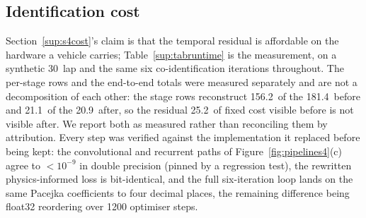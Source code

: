 \documentclass[12pt]{sn-jnl}
\makeatletter
\newif\ifsiu@prev
\DeclareRobustCommand{\siu@sep}{\ifsiu@prev\,\fi}
\DeclareRobustCommand{\siu@unit}[1]{\siu@sep\text{#1}\siu@prevtrue}
\DeclareRobustCommand{\siu@pre}[1]{\siu@sep\text{#1}\siu@prevfalse}
\DeclareRobustCommand{\siu@div}[1]{\text{#1}\siu@prevfalse}
\DeclareRobustCommand{\meter}{m}
\DeclareRobustCommand{\second}{s}
\DeclareRobustCommand{\gram}{g}
\DeclareRobustCommand{\newton}{N}
\DeclareRobustCommand{\radian}{rad}
\DeclareRobustCommand{\hertz}{Hz}
\DeclareRobustCommand{\percent}{\%}
\DeclareRobustCommand{\g}{\textit{g}}
\DeclareRobustCommand{\kilo}{k}
\DeclareRobustCommand{\milli}{m}
\DeclareRobustCommand{\per}{/}
\DeclareRobustCommand{\squared}{\ensuremath{^{2}}}
\providecommand{\degree}{\ensuremath{^{\circ}}}
\DeclareRobustCommand{\si}[1]{\begingroup
  \siu@prevfalse
  \renewcommand{\meter}{\siu@unit{m}}%
  \renewcommand{\second}{\siu@unit{s}}%
  \renewcommand{\gram}{\siu@unit{g}}%
  \renewcommand{\newton}{\siu@unit{N}}%
  \renewcommand{\radian}{\siu@unit{rad}}%
  \renewcommand{\hertz}{\siu@unit{Hz}}%
  \renewcommand{\percent}{\siu@unit{\%}}%
  \renewcommand{\degree}{\siu@unit{\ensuremath{^{\circ}}}}%
  \renewcommand{\g}{\siu@unit{\textit{g}}}%
  \renewcommand{\kilo}{\siu@pre{k}}%
  \renewcommand{\milli}{\siu@pre{m}}%
  \renewcommand{\per}{\siu@div{/}}%
  \renewcommand{\squared}{\ensuremath{^{2}}}%
  #1\endgroup}
\DeclareRobustCommand{\num}[1]{#1}
\DeclareRobustCommand{\SI}[2]{#1\,\si{#2}}
\makeatother
\begin{document}
\subsection{Identification cost}

Section~\ref{sup:s4cost}'s claim is that the temporal residual is affordable
on the hardware a vehicle carries; Table~\ref{sup:tabruntime} is the measurement,
on a synthetic \SI{30}{\second} lap and the same six co-identification
iterations throughout. The per-stage rows and the end-to-end totals were
measured separately and are not a decomposition of each other: the stage rows
reconstruct \SI{156.2}{\second} of the \SI{181.4}{\second} before and
\SI{21.1}{\second} of the \SI{20.9}{\second} after, so the residual
\SI{25.2}{\second} of fixed cost visible before is not visible after. We
report both as measured rather than reconciling them by attribution. Every
step was verified against the implementation it replaced before being kept: the convolutional and recurrent paths of
Figure~\ref{fig:pipelines4}(c) agree to $<10^{-9}$ in double precision (pinned by
a regression test), the rewritten physics-informed loss is bit-identical, and
the full six-iteration loop lands on the same Pacejka coefficients to four
decimal places, the remaining difference being float32 reordering over
\num{1200} optimiser steps.
\end{document}
